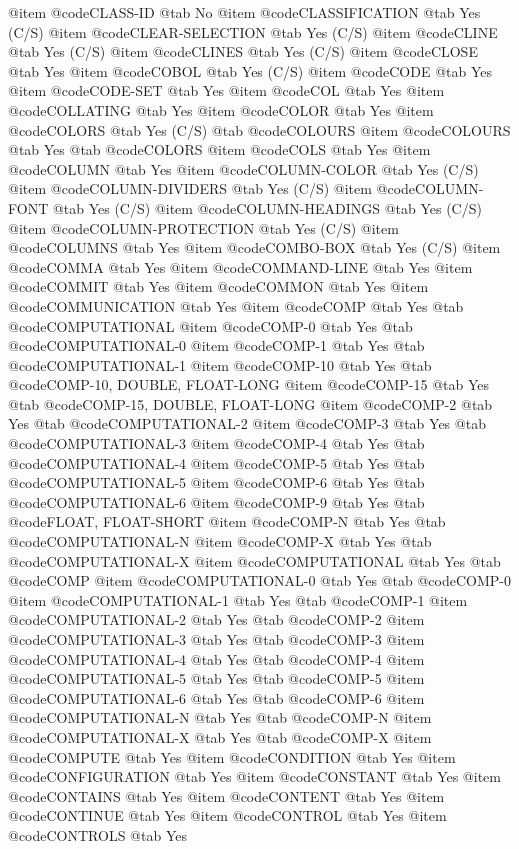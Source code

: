 @item @code{CLASS-ID} @tab No
@item @code{CLASSIFICATION} @tab Yes (C/S)
@item @code{CLEAR-SELECTION} @tab Yes (C/S)
@item @code{CLINE} @tab Yes (C/S)
@item @code{CLINES} @tab Yes (C/S)
@item @code{CLOSE} @tab Yes
@item @code{COBOL} @tab Yes (C/S)
@item @code{CODE} @tab Yes
@item @code{CODE-SET} @tab Yes
@item @code{COL} @tab Yes
@item @code{COLLATING} @tab Yes
@item @code{COLOR} @tab Yes
@item @code{COLORS} @tab Yes (C/S) @tab @code{COLOURS}
@item @code{COLOURS} @tab Yes @tab @code{COLORS}
@item @code{COLS} @tab Yes
@item @code{COLUMN} @tab Yes
@item @code{COLUMN-COLOR} @tab Yes (C/S)
@item @code{COLUMN-DIVIDERS} @tab Yes (C/S)
@item @code{COLUMN-FONT} @tab Yes (C/S)
@item @code{COLUMN-HEADINGS} @tab Yes (C/S)
@item @code{COLUMN-PROTECTION} @tab Yes (C/S)
@item @code{COLUMNS} @tab Yes
@item @code{COMBO-BOX} @tab Yes (C/S)
@item @code{COMMA} @tab Yes
@item @code{COMMAND-LINE} @tab Yes
@item @code{COMMIT} @tab Yes
@item @code{COMMON} @tab Yes
@item @code{COMMUNICATION} @tab Yes
@item @code{COMP} @tab Yes @tab @code{COMPUTATIONAL}
@item @code{COMP-0} @tab Yes @tab @code{COMPUTATIONAL-0}
@item @code{COMP-1} @tab Yes @tab @code{COMPUTATIONAL-1}
@item @code{COMP-10} @tab Yes @tab @code{COMP-10, DOUBLE, FLOAT-LONG}
@item @code{COMP-15} @tab Yes @tab @code{COMP-15, DOUBLE, FLOAT-LONG}
@item @code{COMP-2} @tab Yes @tab @code{COMPUTATIONAL-2}
@item @code{COMP-3} @tab Yes @tab @code{COMPUTATIONAL-3}
@item @code{COMP-4} @tab Yes @tab @code{COMPUTATIONAL-4}
@item @code{COMP-5} @tab Yes @tab @code{COMPUTATIONAL-5}
@item @code{COMP-6} @tab Yes @tab @code{COMPUTATIONAL-6}
@item @code{COMP-9} @tab Yes @tab @code{FLOAT, FLOAT-SHORT}
@item @code{COMP-N} @tab Yes @tab @code{COMPUTATIONAL-N}
@item @code{COMP-X} @tab Yes @tab @code{COMPUTATIONAL-X}
@item @code{COMPUTATIONAL} @tab Yes @tab @code{COMP}
@item @code{COMPUTATIONAL-0} @tab Yes @tab @code{COMP-0}
@item @code{COMPUTATIONAL-1} @tab Yes @tab @code{COMP-1}
@item @code{COMPUTATIONAL-2} @tab Yes @tab @code{COMP-2}
@item @code{COMPUTATIONAL-3} @tab Yes @tab @code{COMP-3}
@item @code{COMPUTATIONAL-4} @tab Yes @tab @code{COMP-4}
@item @code{COMPUTATIONAL-5} @tab Yes @tab @code{COMP-5}
@item @code{COMPUTATIONAL-6} @tab Yes @tab @code{COMP-6}
@item @code{COMPUTATIONAL-N} @tab Yes @tab @code{COMP-N}
@item @code{COMPUTATIONAL-X} @tab Yes @tab @code{COMP-X}
@item @code{COMPUTE} @tab Yes
@item @code{CONDITION} @tab Yes
@item @code{CONFIGURATION} @tab Yes
@item @code{CONSTANT} @tab Yes
@item @code{CONTAINS} @tab Yes
@item @code{CONTENT} @tab Yes
@item @code{CONTINUE} @tab Yes
@item @code{CONTROL} @tab Yes
@item @code{CONTROLS} @tab Yes
